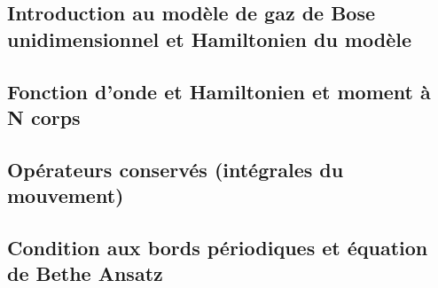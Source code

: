 \subsection{Introduction au modèle de gaz de Bose unidimensionnel et Hamiltonien du modèle}
%



%


%
 
\subsection{Fonction d’onde et Hamiltonien et moment à N corps}
%


\subsection{Opérateurs conservés (intégrales du mouvement)}
%








%



%

\subsection{Condition aux bords périodiques et équation de Bethe Ansatz}